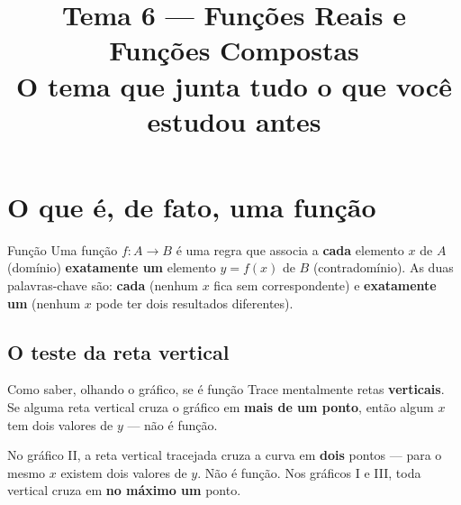 \documentclass[12pt,a4paper]{article}
\title{\vspace{-1.5cm}\textbf{Tema 6 — Funções Reais e Funções Compostas}\\[2pt]\large O tema que junta tudo o que você estudou antes}
\author{}
\date{}
\begin{document}
\maketitle
\thispagestyle{empty}

\section{O que é, de fato, uma função}

\begin{definicao}{Função}
Uma função $f:A\to B$ é uma regra que associa a \textbf{cada} elemento $x$
de $A$ (domínio) \textbf{exatamente um} elemento $y=f(x)$ de $B$
(contradomínio). As duas palavras-chave são: \textbf{cada} (nenhum $x$ fica
sem correspondente) e \textbf{exatamente um} (nenhum $x$ pode ter dois
resultados diferentes).
\end{definicao}

\subsection{O teste da reta vertical}

\begin{dica}{Como saber, olhando o gráfico, se é função}
Trace mentalmente retas \textbf{verticais}. Se alguma reta vertical cruza o
gráfico em \textbf{mais de um ponto}, então algum $x$ tem dois valores de
$y$ — não é função.
\end{dica}

\begin{center}
\end{center}
No gráfico II, a reta vertical tracejada cruza a curva em \textbf{dois}
pontos — para o mesmo $x$ existem dois valores de $y$. Não é função. Nos
gráficos I e III, toda vertical cruza em \textbf{no máximo um} ponto.
\end{document}
